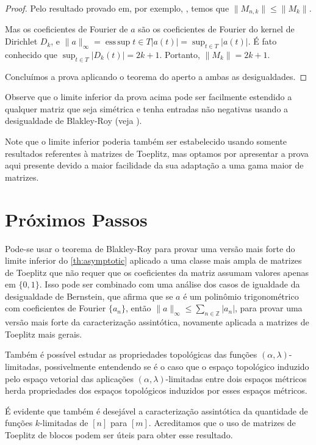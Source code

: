 \documentclass[a4paper,12pt]{article}
\DeclareMathOperator*{\esssup}{ess\,sup}
\theoremstyle{definition}
\begin{document}
\begin{proof}
  Pelo resultado provado em, por exemplo, \cite[p. 52]{bottcher}, temos que $\| M_{n,k} \| \le \| M_k \|$.

  Mas os coeficientes de Fourier de $a$ são os coeficientes de Fourier do kernel de Dirichlet $D_k$, e $\| a \|_{\infty} = \esssup{t \in T} \lvert a(t)\rvert = \sup_{t \in T} \lvert a(t)\rvert$. É fato conhecido que $\sup_{t \in T} \lvert D_k(t)\rvert = 2k + 1$. Portanto, $\| M_k \| = 2k + 1$.

  Concluímos a prova aplicando o teorema do aperto a ambas as desigualdades. \end{proof}

Observe que o limite inferior da prova acima pode ser facilmente estendido a qualquer matriz que seja simétrica e tenha entradas não negativas usando a desigualdade de Blakley-Roy (veja \cite{blakley-roy}).

Note que o limite inferior poderia também ser estabelecido usando somente resultados referentes à matrizes de Toeplitz, mas optamos por apresentar a prova aqui presente devido a maior facilidade da sua adaptação a uma gama maior de matrizes.

\newpage
\section*{Próximos Passos}
\vspace{1cm}

Pode-se usar o teorema de Blakley-Roy para provar uma versão mais forte do limite inferior do \ref*{th:asymptotic} aplicado a uma classe mais ampla de matrizes de Toeplitz que não requer que os coeficientes da matriz assumam valores apenas em $\{0, 1\}$. Isso pode ser combinado com uma análise dos casos de igualdade da desigualdade de Bernstein, que afirma que se $a$ é um polinômio trigonométrico com coeficientes de Fourier $\{a_n\}$, então $\|a\|_\infty \le \sum_{n \in \mathbb{Z}} \lvert a_n\rvert$, para provar uma versão mais forte da caracterização assintótica, novamente aplicada a matrizes de Toeplitz mais gerais.

Também é possível estudar as propriedades topológicas das funções $(\alpha, \lambda)$-limitadas, possivelmente entendendo se é o caso que o espaço topológico induzido pelo espaço vetorial das aplicações $(\alpha, \lambda)$-limitadas entre dois espaços métricos herda propriedades dos espaços topológicos induzidos por esses espaços métricos.

É evidente que também é desejável a caracterização assintótica da quantidade de funções $k$-limitadas de $[n]$ para $[m]$. Acreditamos que o uso de matrizes de Toeplitz de blocos podem ser úteis para obter esse resultado.
\end{document}

